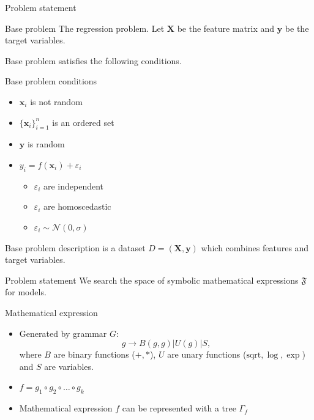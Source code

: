 \documentclass{beamer}
\begin{document}
\begin{frame}{Problem statement}
	\begin{block}{Base problem}
		The regression problem. Let $\mathbf{X}$ be the feature matrix and $\mathbf{y}$ be the target variables.
	\end{block}
	Base problem satisfies the following conditions.
	\begin{block}{Base problem conditions}
		\begin{itemize}
			\item $\mathbf{x}_i$ is not random
			\item $\{\mathbf{x}_i\}_{i=1}^n$ is an ordered set
			\item $\mathbf{y}$ is random
			\item $y_i = f(\mathbf{x}_i) + \varepsilon_i$
			\begin{itemize}
				\item $\varepsilon_i$ are independent
				\item $\varepsilon_i$ are homoscedastic
				\item $\varepsilon_i \sim \mathcal{N}(0, \sigma)$
			\end{itemize}
		\end{itemize}
	\end{block}
	Base problem description is a dataset $D = (\mathbf{X}, \mathbf{y})$ which combines features and target variables.
\end{frame}

\begin{frame}{Problem statement}
	We search the space of symbolic mathematical expressions $\mathfrak{F}$ for models.
	\begin{block}{Mathematical expression}
		\begin{itemize}
			\item Generated by grammar $G$:
			\[g \rightarrow B(g, g)|U(g)|S,\]
			where $B$ are binary functions ($+, *$), $U$ are unary functions ($\text{sqrt}, \log, \exp$) and $S$ are variables.
			\item $f = g_1 \circ g_2 \circ \dots \circ g_k$
			\item Mathematical expression $f$ can be represented with a tree $\Gamma_f$
		\end{itemize}
	\end{block}
\end{frame}
\end{document}
